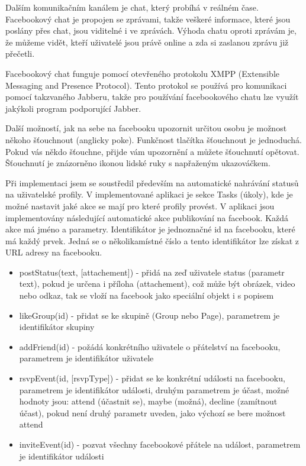 \documentclass[thesis=M,czech]{FITthesis}[2013/05/10]
\begin{document}
Dalším komunikačním kanálem je chat, který probíhá v reálném čase. Facebookový chat je propojen se zprávami, takže veškeré informace, které jsou poslány přes chat, jsou viditelné i ve zprávách. Výhoda chatu oproti zprávám je, že  můžeme vidět, kteří uživatelé jsou právě online a zda si zaslanou zprávu již přečetli. 

Facebookový chat funguje pomocí otevřeného protokolu XMPP (Extensible Messaging and Presence Protocol). Tento protokol se používá pro komunikaci pomocí takzvaného Jabberu, takže pro používání facebookového chatu lze využít jakýkoli program podporující Jabber.

Další možností, jak na sebe na facebooku upozornit určitou osobu je možnost někoho šťouchnout (anglicky poke). Funkčnost tlačítka šťouchnout je jednoduchá. Pokud vás někdo šťouchne, přijde vám upozornění a můžete šťouchnutí opětovat. Šťouchnutí je znázorněno ikonou lidské ruky s napřaženým ukazováčkem.

Při implementaci jsem se soustředil především na automatické nahrávání statusů na uživatelské profily. V implementované aplikaci je sekce Tasks (úkoly), kde je možné nastavit jaké akce se mají pro které profily provést. V aplikaci jsou implementovány následující automatické akce publikování na facebook. Každá akce má jméno a parametry. Identifikátor je jednoznačné id na facebooku, které má každý prvek. Jedná se o několikamístné číslo a tento identifikátor lze získat z URL adresy na facebooku.

\begin{itemize}
  \item postStatus(text, [attachement]) - přidá na zeď uživatele status (parametr text), pokud je určena i příloha (attachement), což může být obrázek, video nebo odkaz, tak se vloží na facebook jako speciální objekt i s popisem
  \item likeGroup(id) - přidat se ke skupině (Group nebo Page), parametrem je identifikátor skupiny 
  \item addFriend(id) - požádá konkrétního uživatele o přátelství na facebooku, parametrem je identifikátor uživatele
  \item rsvpEvent(id, [rsvpType]) - přidat se ke konkrétní události na facebooku, parametrem je identifikátor události, druhým parametrem je účast, možné hodnoty jsou: attend (účastnit se), maybe (možná), decline (zamítnout účast), pokud není druhý parametr uveden, jako výchozí se bere možnost attend
  \item inviteEvent(id) - pozvat všechny facebookové přátele na událost, parametrem je identifikátor události
\end{itemize}
\end{document}
